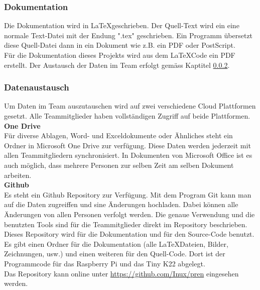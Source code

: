 \documentclass[../../main.tex]{subfiles}
\begin{document}
\subsubsection{Dokumentation}
Die Dokumentation wird in \LaTeX geschrieben. Der Quell-Text wird ein eine normale Text-Datei mit der Endung ".tex" geschrieben. Ein Programm übersetzt diese Quell-Datei dann in ein Dokument wie z.B. ein PDF oder PostScript. \cite{whatislatex}\\
Für die Dokumentation dieses Projekts wird aus dem \LaTeX Code ein PDF erstellt. Der Austausch der Daten im Team erfolgt gemäss Kaptitel \ref{proj_datenaustausch}.

\subsubsection{Datenaustausch} \label{proj_datenaustausch}
Um Daten im Team auszutauschen wird auf zwei verschiedene Cloud Plattformen gesetzt. Alle Teammitglieder haben vollständigen Zugriff auf beide Plattformen.\\

\textbf{One Drive}\\
Für diverse Ablagen, Word- und Exceldokumente oder Ähnliches steht ein Ordner in Microsoft One Drive zur verfügung. Diese Daten werden jederzeit mit allen Teammitgliedern synchronisiert. In Dokumenten von Microsoft Office ist es auch möglich, dass mehrere Personen zur selben Zeit am selben Dokument arbeiten.\\

\textbf{Github}\\
Es steht ein Github Repository zur Verfügung. Mit dem Program Git kann man auf die Daten zugreiffen und sine Änderungen hochladen. Dabei können alle Änderungen von allen Personen verfolgt werden. Die genaue Verwendung und die benutzten Tools sind für die Teammitglieder direkt im Repository beschrieben.\\
Dieses Repository wird für die Dokumentation und für den Source-Code benutzt. Es gibt einen Ordner für die Dokumentation (alle \LaTeX Dateien, Bilder, Zeichnungen, usw.) und einen weiteren für den Quell-Code. Dort ist der Programmcode für das Raspberry Pi und das Tiny K22 abgelegt.\\
Das Repository kann online unter \url{https://github.com/Inux/pren} eingesehen werden.
\end{document}
